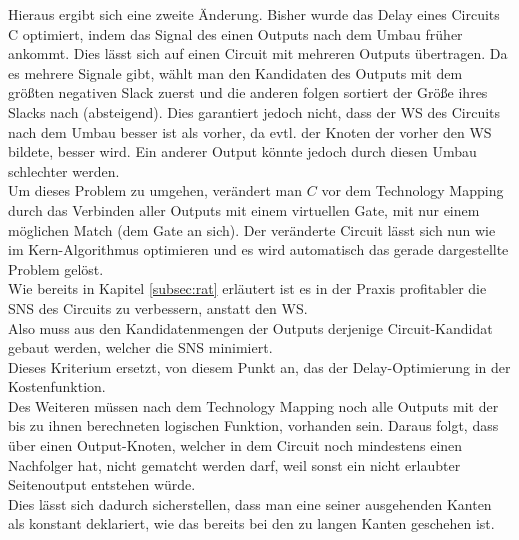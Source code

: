 \documentclass[11pt, a4paper, german]{article}
\newcommand{\TM}{Technology  Mapping }
\begin{document}
Hieraus ergibt sich eine zweite Änderung. Bisher wurde das Delay eines Circuits C optimiert, indem das Signal des einen Outputs nach dem Umbau früher ankommt. Dies lässt sich auf einen Circuit mit mehreren Outputs übertragen. Da es mehrere Signale gibt, wählt man den Kandidaten des Outputs mit dem größten negativen Slack zuerst und die anderen folgen sortiert der Größe ihres Slacks nach (absteigend). Dies garantiert jedoch nicht, dass der WS des Circuits nach dem Umbau besser ist als vorher, da evtl. der Knoten der vorher den WS bildete, besser wird. Ein anderer Output könnte jedoch durch diesen Umbau schlechter werden. \\
Um dieses Problem zu umgehen, verändert man $C$ vor dem \TM durch das Verbinden aller Outputs mit einem virtuellen Gate, mit nur einem möglichen Match (dem Gate an sich). Der veränderte Circuit lässt sich nun wie im Kern-Algorithmus optimieren und es wird automatisch das gerade dargestellte Problem gelöst.\\ 
Wie bereits in Kapitel \ref{subsec:rat}  erläutert ist es in der Praxis profitabler die SNS des Circuits zu verbessern, anstatt den WS.\\
Also muss aus den Kandidatenmengen der Outputs derjenige Circuit-Kandidat gebaut werden, welcher die SNS minimiert.\\
 Dieses Kriterium ersetzt, von diesem Punkt an,  das der Delay-Optimierung in der Kostenfunktion.\\
 
 Des Weiteren müssen nach dem \TM noch alle Outputs mit der bis zu ihnen berechneten logischen Funktion, vorhanden sein. Daraus folgt, dass über einen Output-Knoten, welcher in dem Circuit noch mindestens einen Nachfolger hat, nicht gematcht werden darf, weil sonst ein nicht erlaubter Seitenoutput entstehen würde.\\
 Dies lässt sich dadurch sicherstellen, dass man eine seiner ausgehenden Kanten als konstant deklariert, wie das bereits bei den zu langen Kanten geschehen ist. 
 
\end{document}
